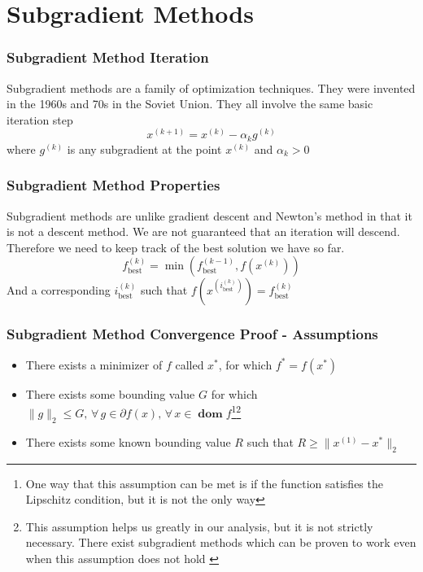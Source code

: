 \documentclass{beamer}
\DeclareMathOperator{\dom}{\mathbf{dom}}
\DeclareMathOperator{\best}{best}
\let\oldforall\forall
\renewcommand{\forall}{ \, \oldforall \, }
\begin{document}
\section{Subgradient Methods}
\begin{frame}
\frametitle{Subgradient Method Iteration}
Subgradient methods are a family of optimization techniques. They were invented in the 1960s and 70s in the Soviet Union. They all involve the same basic iteration step \cite{boydparksubgradients}
\begin{equation}\label{eq:subgradient method iteration}
x^{(k+1)} = x^{(k)} - \alpha_k g^{(k)}
\end{equation}
where \(g^{(k)}\) is any subgradient at the point \(x^{(k)}\) and \(\alpha_k > 0\)
\end{frame}

\begin{frame}
\frametitle{Subgradient Method Properties}
Subgradient methods are unlike gradient descent and Newton's method in that it is not a descent method. We are not guaranteed that an iteration will descend. Therefore we need to keep track of the best solution we have so far.
\begin{equation}\label{eq:track best}
f^{(k)}_{\best} = \min (f^{(k-1)}_{\best}, f(x^{(k)}))
\end{equation}
And a corresponding \(i^{(k)}_{\best}\) such that \(f(x^{(i^{(k)}_{\best})}) = f^{(k)}_{\best}\)
\end{frame}

\begin{frame}
\frametitle{Subgradient Method Convergence Proof - Assumptions}
\begin{itemize}
    \item There exists a minimizer of \(f\) called \(x^*\), for which \(f^* = f(x^*)\)
    \item There exists some bounding value \(G\) for which \(\|g\|_2 \leq G, \forall g \in \partial f(x), \forall x \in \dom f\)\footnote{One way that this assumption can be met is if the function satisfies the Lipschitz condition, but it is not the only way}\footnote{This assumption helps us greatly in our analysis, but it is not strictly necessary. There exist subgradient methods which can be proven to work even when this assumption does not hold \cite{boydparksubgradients}}
    \item There exists some known bounding value \(R\) such that \(R \geq \|x^{(1)}-x^*\|_2\)
\end{itemize}
\end{frame}
\end{document}
